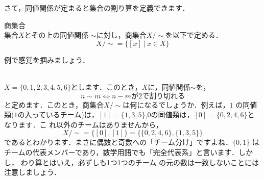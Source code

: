 
さて，同値関係が定まると集合の割り算を定義できます．

\begin{defi}商集合\\
 集合$X$とその上の同値関係
 $\sim$に対し，商集合$X/\sim$を以下で定める．
 \[
  X/\sim=\{[x]\ |\ x\in X\}
 \]
\end{defi}

例で感覚を掴みましょう．

 \begin{ex}{\ } \\
  $X=\{0,1,2,3,4,5,6\}$とします．このとき，$X$に，同値関係$\sim$を，
 \[
  n\sim m\Leftrightarrow n-mが2で割り切れる
 \]
  と定めます．このとき，商集合$X/\sim$は何になるでしょうか．例えば，$1$
  の同値類($1$の入っているチーム)は，$[1]=\{1,3,5\}$,$0$の同値類は，$[0]=\{0,2,4,6\}$となります．こ
  れ以外のチームはありませんから，
  \[
   X/\sim=\{[0],[1]\}=\{\{0,2,4,6\},\{1,3,5\}\}
  \]
であるとわかります．まさに偶数と奇数への「チーム分け」ですよね．$\{0,1\}$
  はチームの代表メンバーであり，数学用語でも「完全代表系」と言います．しかし，
  わり算とはいえ，必ずしも1つ1つのチーム
  の元の数は一致しないことには注意しましょう．
 \end{ex}

